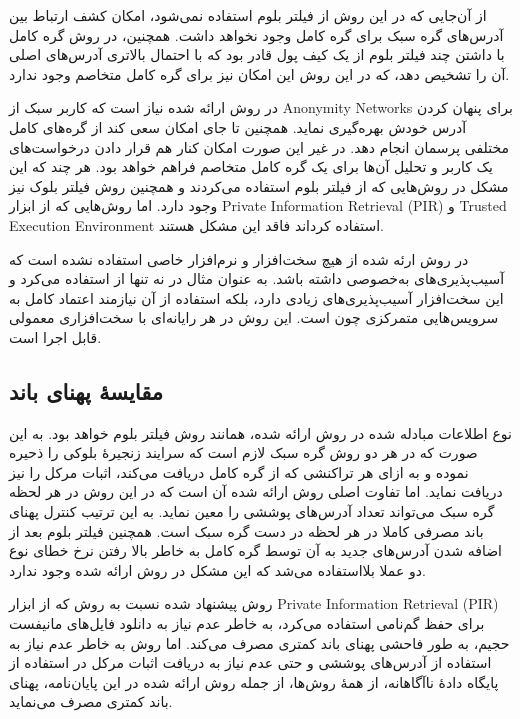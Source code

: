 از آن‌جایی که در این روش از فیلتر بلوم استفاده نمی‌شود، امکان کشف ارتباط بین آدرس‌های گره سبک برای گره کامل وجود نخواهد داشت. همچنین، در روش  \cite{Hearn2013} گره کامل با داشتن چند فیلتر بلوم از یک کیف پول قادر بود که با احتمال بالاتری آدرس‌های اصلی آن را تشخیص دهد، که در این روش این امکان نیز برای گره کامل متخاصم وجود ندارد. 

در روش ارائه شده نیاز است که کاربر سبک از 
\glspl{Anonymity Network}
برای پنهان کردن آدرس  خودش بهره‌گیری نماید. همچنین تا جای امکان سعی کند از گره‌های کامل مختلفی پرسمان انجام دهد. در غیر این صورت امکان کنار هم قرار دادن درخواست‌های یک کاربر و تحلیل آن‌ها برای یک گره کامل متخاصم فراهم خواهد بود. هر چند که این مشکل در روش‌هایی که از فیلتر بلوم استفاده می‌کردند \cite{Hearn2013,Kanemura2017} و همچنین روش فیلتر بلوک \cite{Osuntokun2017} نیز وجود دارد. اما روش‌هایی که از ابزار 
\gls{Private Information Retrieval (PIR)}
 \cite{Qin2019} و 
 \gls{Trusted Execution Environment}
  \cite{Matetic2019} استفاده کرداند فاقد این مشکل هستند.

در روش ارئه شده از هیچ سخت‌افزار و نرم‌افزار خاصی استفاده نشده است که آسیب‌پذیری‌های به‌خصوصی داشته باشد. به عنوان مثال در \cite{Matetic2019}  نه تنها از 
استفاده می‌کرد و این سخت‌افزار آسیب‌پذیری‌های زیادی دارد، بلکه استفاده از آن نیازمند اعتماد کامل به سرویس‌هایی متمرکزی چون \cite{EPID} است. این روش در هر رایانه‌ای با سخت‌افزاری معمولی  قابل اجرا است.

\subsection{مقایسهٔ پهنای باند}
نوع اطلاعات مبادله شده در روش ارائه شده، همانند روش فیلتر بلوم \cite{Hearn2013} خواهد بود. به این صورت که در هر دو روش گره سبک لازم است که سرایند زنجیرهٔ بلوکی را ذحیره نموده و به ازای هر تراکنشی که از گره کامل دریافت می‌کند، اثبات مرکل را نیز دریافت نماید. اما تفاوت اصلی روش ارائه شده آن است که در این روش در هر لحظه گره سبک می‌تواند تعداد آدرس‌های پوششی را معین نماید. به این ترتیب کنترل پهنای باند مصرفی کاملا در هر لحظه در دست گره سبک است. همچنین فیلتر بلوم بعد از اضافه شدن آدرس‌های جدید به آن توسط گره کامل به خاطر بالا رفتن نرخ خطای نوع دو عملا بلااستفاده می‌شد که این مشکل در روش ارائه شده وجود ندارد.

روش پیشنهاد شده نسبت به روش \cite{Qin2019}  که از ابزار 
\gls{Private Information Retrieval (PIR)}
برای حفظ گم‌نامی استفاده می‌کرد، به خاطر عدم نیاز به دانلود فایل‌های مانیفست حجیم، به طور فاحشی پهنای باند کمتری مصرف می‌کند. اما روش  \cite{Matetic2019} به خاطر عدم نیاز به استفاده از آدرس‌های پوششی و حتی عدم نیاز به دریافت اثبات مرکل در استفاده از پایگاه دادهٔ ناآگاهانه، از همهٔ روش‌ها، از جمله روش ارائه شده در این پایان‌نامه، پهنای باند کمتری مصرف می‌نماید.

